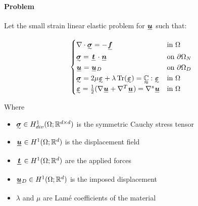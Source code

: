 \documentclass[fleqn]{article}
\newcommand{\Hdiv}{
  H^1_{div}(\Omega; \mathbb{R}^{d \times d})
}
\newcommand{\Hone}{
  H^{1}(\Omega; \mathbb{R}^{d})
}
\begin{document}


    \paragraph{Problem}

      Let the small strain linear elastic problem for $\tensori{u}$ such that:

      \begin{equation}
        \begin{cases}
          \nabla \cdot \tensorii{\sigma} = -\tensori{f} & \mbox{in } \Omega
          \\
          \tensorii{\sigma} = \tensori{t} \cdot \tensori{n} & \mbox{on } \partial \Omega_N
          \\
          \tensori{u} = \tensori{u} \subscript{D} & \mbox{on } \partial \Omega_D
          \\
          \tensorii{\sigma} = 2 \mu \tensorii{\varepsilon} + \lambda \Tr (\tensorii{\varepsilon}) = \tensoriv{\mathbb{C}} : \tensorii{\varepsilon} & \mbox{in } \Omega
          \\
          \tensorii{\varepsilon} = \frac{1}{2}(\nabla \tensori{u} + \nabla^T \tensori{u}) = \nabla^s \tensori{u} & \mbox{in } \Omega
        \end{cases}
        \label{eq_linear_elastic}
      \end{equation}
      
      Where

      \begin{itemize}
        \item $\tensorii{\sigma} \in \Hdiv$ is the symmetric Cauchy stress tensor
        \item $\tensori{u} \in \Hone$ is the displacement field
        \item $\tensori{t} \in \Hone$ are the applied forces
        \item $\tensori{u} \subscript{D} \in \Hone$ is the imposed displacement
        \item $\lambda$ and $\mu$ are Lamé coefficients of the material
      \end{itemize}
\end{document}
